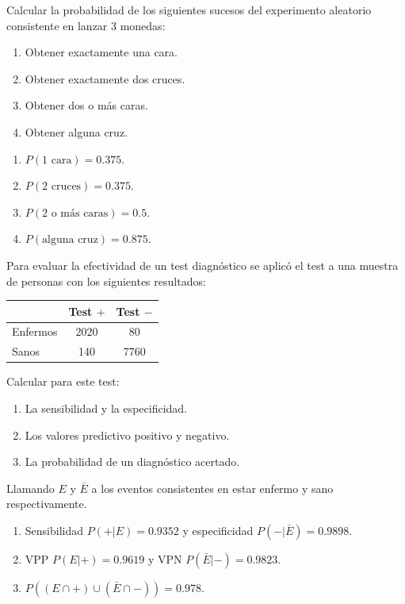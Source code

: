 {Calcular la probabilidad de los siguientes sucesos del experimento aleatorio consistente en lanzar 3 monedas:
\begin{enumerate}
\item Obtener exactamente una cara.  
\item Obtener exactamente dos cruces.
\item Obtener dos o más caras.
\item Obtener alguna cruz. 
\end{enumerate}
}
{
\begin{enumerate}
\item $P(\mbox{1 cara})=0.375$. 
\item $P(\mbox{2 cruces})=0.375$. 
\item $P(\mbox{2 o más caras})=0.5$. 
\item $P(\mbox{alguna cruz})=0.875$.
\end{enumerate}
}
{}


{Para evaluar la efectividad de un test diagnóstico se aplicó el test a una muestra de personas con los siguientes resultados:
\begin{center}
\begin{tabular}{|l|c|c|}
\cline{2-3}
\multicolumn{1}{l|}{} & Test $+$ & Test $-$ \\
\hline
Enfermos & 2020 & 80 \\
\hline
Sanos & 140 & 7760 \\
\hline
\end{tabular}
\end{center}

Calcular para este test:
\begin{enumerate}
\item La sensibilidad y la especificidad.
\item Los valores predictivo positivo y negativo.
\item La probabilidad de un diagnóstico acertado. 
\end{enumerate}
}
{Llamando $E$ y $\bar E$ a los eventos consistentes en estar enfermo y sano respectivamente. 
\begin{enumerate}
\item Sensibilidad $P(+|E)=0.9352$ y especificidad $P(-|\bar E)=0.9898$. 
\item VPP $P(E|+)=0.9619$ y VPN $P(\bar E|-)=0.9823$.
\item $P((E\cap +)\cup (\bar E\cap -))= 0.978$.
\end{enumerate}
}
{}


